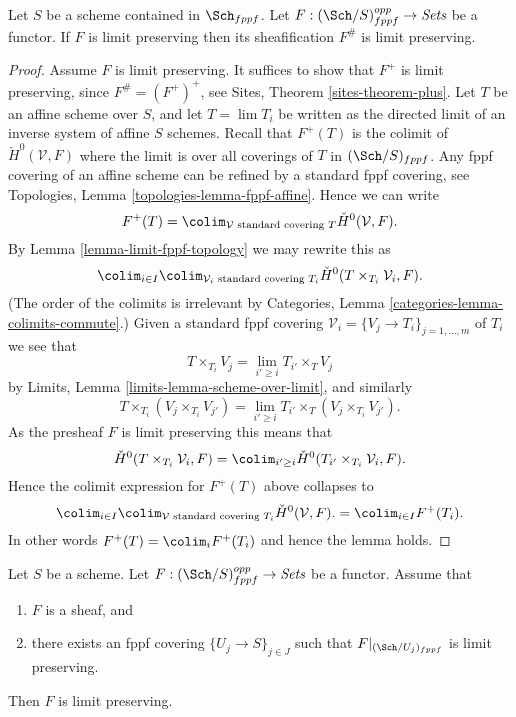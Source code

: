 \begin{lemma}
\label{lemma-sheafify-finite-presentation}
Let $S$ be a scheme contained in $\Sch_{fppf}$.
Let $F : (\Sch/S)_{fppf}^{opp} \to \textit{Sets}$ be a functor.
If $F$ is limit preserving then its sheafification $F^\#$ is limit preserving.
\end{lemma}

\begin{proof}
Assume $F$ is limit preserving.
It suffices to show that $F^+$ is limit preserving, since
$F^\# = (F^+)^+$, see
Sites, Theorem \ref{sites-theorem-plus}.
Let $T$ be an affine scheme over $S$, and let $T = \lim T_i$ be written
as the directed limit of an inverse system of affine $S$ schemes.
Recall that $F^+(T)$ is the colimit of $\check H^0(\mathcal{V}, F)$
where the limit is over all coverings of $T$ in $(\Sch/S)_{fppf}$.
Any fppf covering of an affine scheme can be refined by a standard
fppf covering, see
Topologies, Lemma \ref{topologies-lemma-fppf-affine}.
Hence we can write
$$
F^+(T)
=
\colim_{\mathcal{V}\text{ standard covering }T}
\check H^0(\mathcal{V}, F).
$$
By
Lemma \ref{lemma-limit-fppf-topology}
we may rewrite this as
$$
\colim_{i \in I}
\colim_{\mathcal{V}_i\text{ standard covering }T_i}
\check H^0(T \times_{T_i}\mathcal{V}_i, F).
$$
(The order of the colimits is irrelevant by
Categories, Lemma \ref{categories-lemma-colimits-commute}.)
Given a standard fppf covering
$\mathcal{V}_i = \{V_j \to T_i\}_{j = 1, \ldots, m}$ of $T_i$ we see that
$$
T \times_{T_i} V_j = \lim_{i' \geq i} T_{i'} \times_T V_j
$$
by
Limits, Lemma \ref{limits-lemma-scheme-over-limit}, and similarly
$$
T \times_{T_i} (V_j \times_{T_i} V_{j'}) =
\lim_{i' \geq i} T_{i'} \times_T (V_j \times_{T_i} V_{j'}).
$$
As the presheaf $F$ is limit preserving this means that
$$
\check H^0(T \times_{T_i}\mathcal{V}_i, F)
=
\colim_{i' \geq i}
\check H^0(T_{i'} \times_{T_i}\mathcal{V}_i, F).
$$
Hence the colimit expression for $F^+(T)$ above collapses to
$$
\colim_{i \in I} \colim_{\mathcal{V}\text{ standard covering }T_i}
\check H^0(\mathcal{V}, F).
=
\colim_{i \in I} F^+(T_i).
$$
In other words $F^+(T) = \colim_i F^+(T_i)$ and hence
the lemma holds.
\end{proof}

\begin{lemma}
\label{lemma-sheaf-finite-presentation}
Let $S$ be a scheme.
Let $F : (\Sch/S)_{fppf}^{opp} \to \textit{Sets}$ be a functor.
Assume that
\begin{enumerate}
\item $F$ is a sheaf, and
\item there exists an fppf covering $\{U_j \to S\}_{j \in J}$ such that
$F|_{(\Sch/U_j)_{fppf}}$ is limit preserving.
\end{enumerate}
Then $F$ is limit preserving.
\end{lemma}

